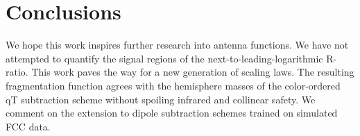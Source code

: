 \section{Conclusions}\label{sec:conclusions}

We hope this work inspires further research into antenna functions. We
have not attempted to quantify the signal regions of the
next-to-leading-logarithmic R-ratio. This work paves the way for a new
generation of scaling laws. The resulting fragmentation function agrees
with the hemisphere masses of the color-ordered qT subtraction scheme
without spoiling infrared and collinear safety. We comment on the
extension to dipole subtraction schemes trained on simulated FCC data.

